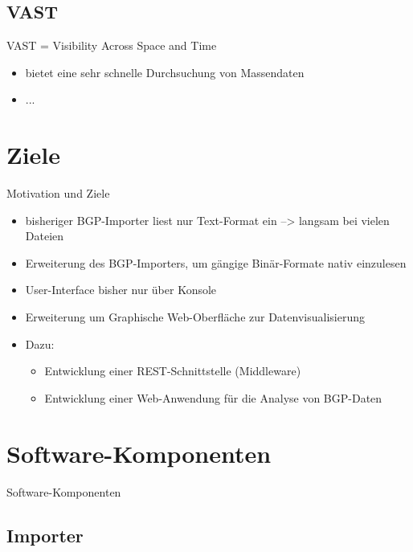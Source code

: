 \documentclass[9pt]{beamer}
\begin{document}
\subsection{VAST}

\begin{frame}{VAST = Visibility Across Space and Time}{}
	\begin{itemize}
		\item bietet eine sehr schnelle Durchsuchung von Massendaten
		\item ...
	\end{itemize}
\end{frame}


\section{Ziele}

\begin{frame}{Motivation und Ziele}{}
	\begin{itemize}
		\item bisheriger BGP-Importer liest nur Text-Format ein --> langsam bei vielen Dateien
		\item Erweiterung des BGP-Importers, um gängige Binär-Formate nativ einzulesen
		\item User-Interface bisher nur über Konsole
		\item Erweiterung um Graphische Web-Oberfläche zur Datenvisualisierung
		\item Dazu:
		\begin{itemize}
			\item Entwicklung einer REST-Schnittstelle (Middleware)
			\item Entwicklung einer Web-Anwendung für die Analyse von BGP-Daten
		\end{itemize}
	\end{itemize}
\end{frame}

\section{Software-Komponenten}

\begin{frame}{Software-Komponenten}{}
	\begin{center}
	\end{center}
\end{frame}

\subsection{Importer}
\end{document}
